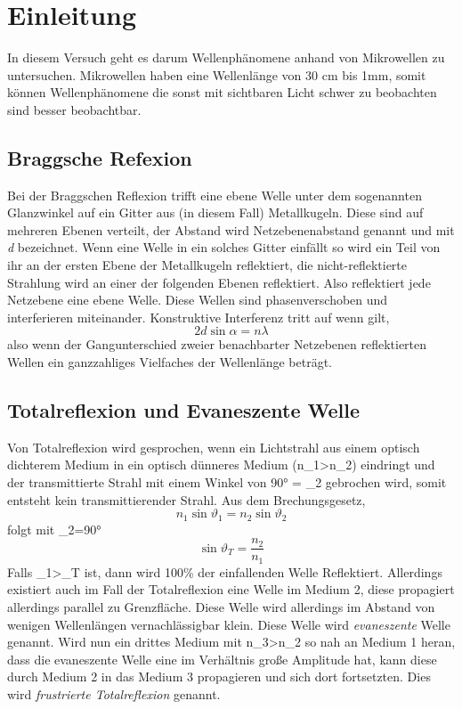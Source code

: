\section{Einleitung}
In diesem Versuch geht es darum Wellenphänomene anhand von Mikrowellen zu untersuchen.
Mikrowellen haben eine Wellenlänge von 30 \si{cm} bis 1\si{mm}, somit können Wellenphänomene die sonst mit sichtbaren Licht schwer zu beobachten sind besser beobachtbar.
\subsection{Braggsche Refexion}
Bei der Braggschen Reflexion trifft eine ebene Welle unter dem sogenannten Glanzwinkel \alpha auf ein Gitter aus (in diesem Fall) Metallkugeln. Diese sind auf mehreren Ebenen verteilt, der Abstand wird Netzebenenabstand genannt und mit \textit{d} bezeichnet.
Wenn eine Welle in ein solches Gitter einfällt so wird ein Teil von ihr an der ersten Ebene der Metallkugeln reflektiert, die nicht-reflektierte Strahlung wird an einer der folgenden Ebenen reflektiert. Also reflektiert jede Netzebene eine ebene Welle. Diese Wellen sind phasenverschoben und interferieren miteinander. Konstruktive Interferenz tritt auf wenn gilt,
\begin{equation}
2\textit{d}\sin \alpha=n\lambda
\end{equation}
also wenn der Gangunterschied zweier benachbarter Netzebenen reflektierten Wellen ein ganzzahliges Vielfaches der Wellenlänge beträgt.
\subsection{Totalreflexion und Evaneszente Welle}
Von Totalreflexion wird gesprochen, wenn ein Lichtstrahl aus einem optisch dichterem Medium in ein optisch dünneres Medium (n_{1}>n_{2}) eindringt und der transmittierte Strahl mit einem Winkel von 90° = \vartheta_{2} gebrochen wird, somit entsteht kein transmittierender Strahl.
Aus dem Brechungsgesetz,
\begin{equation}
n_{1}\sin \vartheta_{1}=n_{2}\sin\vartheta_{2}
\end{equation}
folgt mit \vartheta_{2}=90°
\begin{equation}
\sin\vartheta_{T}=\frac{n_{2}}{n_{1}}
\end{equation}
Falls \vartheta_{1}>\vartheta_{T} ist, dann wird 100\% der einfallenden Welle Reflektiert.
Allerdings existiert auch im Fall der Totalreflexion eine Welle im Medium 2, diese propagiert allerdings parallel zu Grenzfläche. Diese Welle wird allerdings im Abstand von wenigen Wellenlängen vernachlässigbar klein. Diese Welle wird \textit{evaneszente} Welle genannt.
Wird nun ein drittes Medium mit n_{3}>n_{2} so nah an Medium 1 heran, dass die evaneszente Welle eine im Verhältnis große Amplitude hat, kann diese durch Medium 2 in das Medium 3 propagieren und sich dort fortsetzten. Dies wird \textit{frustrierte Totalreflexion} genannt.



